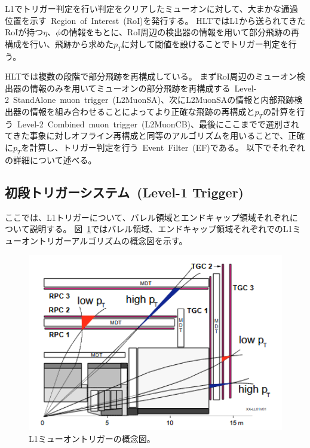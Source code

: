 L1でトリガー判定を行い判定をクリアしたミューオンに対して、大まかな通過位置を示す~Region~of~Interest~(RoI)を発行する。
HLTではL1から送られてきたRoIが持つ$\eta$、$\phi$の情報をもとに、RoI周辺の検出器の情報を用いて部分飛跡の再構成を行い、飛跡から求めた$p_T$に対して閾値を設けることでトリガー判定を行う。

HLTでは複数の段階で部分飛跡を再構成している。
まずRoI周辺のミューオン検出器の情報のみを用いてミューオンの部分飛跡を再構成する~Level-2~StandAlone~muon~trigger~(L2MuonSA)、次にL2MuonSAの情報と内部飛跡検出器の情報を組み合わせることによってより正確な飛跡の再構成と$p_T$の計算を行う~Level-2~Combined~muon~trigger~(L2MuonCB)、最後にここまでで選別されてきた事象に対しオフライン再構成と同等のアルゴリズムを用いることで、正確に$p_T$を計算し、トリガー判定を行う~Event~Filter~(EF)である。
以下でそれぞれの詳細について述べる。

\subsection{初段トリガーシステム~(Level-1 Trigger)}\label{chapter3-2-1}
ここでは、L1トリガーについて、バレル領域とエンドキャップ領域それぞれについて説明する。
図~\ref{fig:3-2}ではバレル領域、エンドキャップ領域それぞれでのL1ミューオントリガーアルゴリズムの概念図を示す。

\begin{figure}[h]
  \centering
  \includegraphics[clip, width=13cm]{fig/3/muon_trigger_overview.png}
  \caption{L1ミューオントリガーの概念図\cite{article:barrelSystem}。}
  \label{fig:3-2}
\end{figure}

